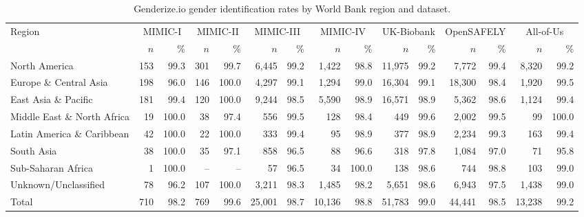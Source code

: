 \begin{table}[htbp]
\centering
\caption{Genderize.io gender identification rates by World Bank region and dataset.}
\label{tab:genderize_regional}
\begin{tabular}{lrrrrrrrrrrrrrr}
\toprule
Region & \multicolumn{2}{c}{MIMIC-I} & \multicolumn{2}{c}{MIMIC-II} & \multicolumn{2}{c}{MIMIC-III} & \multicolumn{2}{c}{MIMIC-IV} & \multicolumn{2}{c}{UK-Biobank} & \multicolumn{2}{c}{OpenSAFELY} & \multicolumn{2}{c}{All-of-Us} \\
\cmidrule(lr){2-3} \cmidrule(lr){4-5} \cmidrule(lr){6-7} \cmidrule(lr){8-9} \cmidrule(lr){10-11} \cmidrule(lr){12-13} \cmidrule(lr){14-15} 
 & $n$ & \% & $n$ & \% & $n$ & \% & $n$ & \% & $n$ & \% & $n$ & \% & $n$ & \% \\
\midrule
North America & 153 & 99.3 & 301 & 99.7 & 6,445 & 99.2 & 1,422 & 98.8 & 11,975 & 99.2 & 7,772 & 99.4 & 8,320 & 99.2 \\
Europe \& Central Asia & 198 & 96.0 & 146 & 100.0 & 4,297 & 99.1 & 1,294 & 99.0 & 16,304 & 99.1 & 18,300 & 98.4 & 1,920 & 99.5 \\
East Asia \& Pacific & 181 & 99.4 & 120 & 100.0 & 9,244 & 98.5 & 5,590 & 98.9 & 16,571 & 98.9 & 5,362 & 98.6 & 1,124 & 99.4 \\
Middle East \& North Africa & 19 & 100.0 & 38 & 97.4 & 556 & 99.5 & 128 & 98.4 & 449 & 99.6 & 2,002 & 99.5 & 99 & 100.0 \\
Latin America \& Caribbean & 42 & 100.0 & 22 & 100.0 & 333 & 99.4 & 95 & 98.9 & 377 & 98.9 & 2,234 & 99.3 & 163 & 99.4 \\
South Asia & 38 & 100.0 & 35 & 97.1 & 858 & 96.5 & 88 & 96.6 & 318 & 97.8 & 1,084 & 97.0 & 71 & 95.8 \\
Sub-Saharan Africa & 1 & 100.0 & -- & -- & 57 & 96.5 & 34 & 100.0 & 138 & 98.6 & 744 & 98.8 & 103 & 99.0 \\
Unknown/Unclassified & 78 & 96.2 & 107 & 100.0 & 3,211 & 98.3 & 1,485 & 98.2 & 5,651 & 98.6 & 6,943 & 97.5 & 1,438 & 99.0 \\
\midrule
Total & 710 & 98.2 & 769 & 99.6 & 25,001 & 98.7 & 10,136 & 98.8 & 51,783 & 99.0 & 44,441 & 98.5 & 13,238 & 99.2 \\
\bottomrule
\end{tabular}
\end{table}
